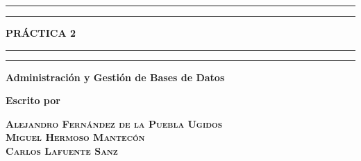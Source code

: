 \documentclass[a4paper, 11pt, oneside]{article} %
\begin{document}
 

\begin{titlepage} %

	\centering
	
	\scshape %
	
	\vspace*{\baselineskip} %
	
	
	\rule{\textwidth}{1.6pt}\vspace*{-\baselineskip}\vspace*{2pt} %
	\rule{\textwidth}{0.4pt} %
	
	\vspace{0.75\baselineskip} %
	
	{\LARGE \textbf{PRÁCTICA 2}} %
	
	\vspace{0.75\baselineskip} %
	
	\rule{\textwidth}{0.4pt}\vspace*{-\baselineskip}\vspace{3.2pt} %
	\rule{\textwidth}{1.6pt} %
	
	\vspace{2\baselineskip} %
	
	
	\textbf{Administración y Gestión de Bases de Datos} %
	
	\vspace*{3\baselineskip} %
	
	
	\textbf{Escrito por}
	
	\vspace{0.5\baselineskip} %
	
	{\scshape\Large \textbf{Alejandro Fernández de la Puebla Ugidos\\ Miguel Hermoso Mantecón \\ Carlos Lafuente Sanz \\}} %
	

\end{titlepage}
\end{document}
